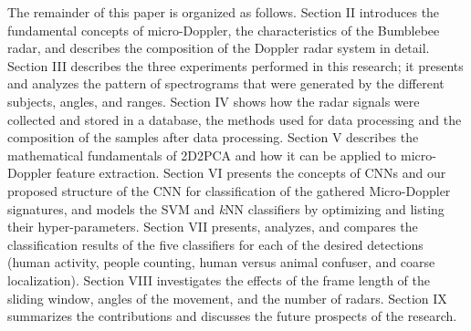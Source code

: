 The remainder of this paper is organized as follows. Section II introduces the fundamental concepts of micro-Doppler, the characteristics of the Bumblebee radar, and describes the composition of the Doppler radar system in detail. Section III describes the three experiments performed in this research; it presents and analyzes the pattern of spectrograms that were generated by the different subjects, angles, and ranges. Section IV shows how the radar signals were collected and stored in a database, the methods used for data processing and the composition of the samples after data processing. Section V describes the mathematical fundamentals of 2D2PCA and how it can be applied to micro-Doppler feature extraction. Section VI presents the concepts of CNNs and our proposed structure of the CNN for classification of the gathered Micro-Doppler signatures, and models the SVM and \textit{k}NN classifiers by optimizing and listing their hyper-parameters. Section VII presents, analyzes, and compares the classification results of the five classifiers for each of the desired detections (human activity, people counting, human versus animal confuser, and coarse localization). Section VIII investigates the effects of the frame length of the sliding window, angles of the movement, and the number of radars. Section IX summarizes the contributions and discusses the future prospects of the research.